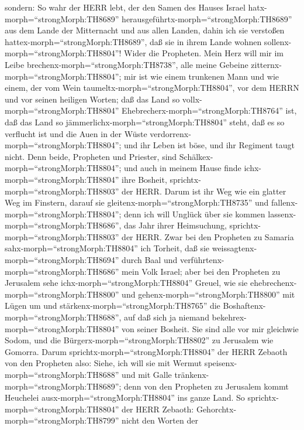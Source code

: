  sondern: So wahr der HERR lebt, der den Samen des Hauses
Israel hatx-morph=``strongMorph:TH8689''
herausgeführtx-morph=``strongMorph:TH8689'' aus dem Lande der
Mitternacht und aus allen Landen, dahin ich sie verstoßen
hattex-morph=``strongMorph:TH8689'', daß sie in ihrem Lande wohnen
sollenx-morph=``strongMorph:TH8804''!  Wider die Propheten.
Mein Herz will mir im Leibe brechenx-morph=``strongMorph:TH8738'', alle
meine Gebeine zitternx-morph=``strongMorph:TH8804''; mir ist wie einem
trunkenen Mann und wie einem, der vom Wein
taumeltx-morph=``strongMorph:TH8804'', vor dem HERRN und vor seinen
heiligen Worten;  daß das Land so
vollx-morph=``strongMorph:TH8804''
Ehebrecherx-morph=``strongMorph:TH8764'' ist, daß das Land so
jämmerlichx-morph=``strongMorph:TH8804'' steht, daß es so verflucht ist
und die Auen in der Wüste verdorrenx-morph=``strongMorph:TH8804''; und
ihr Leben ist böse, und ihr Regiment taugt nicht.  Denn
beide, Propheten und Priester, sind
Schälkex-morph=``strongMorph:TH8804''; und auch in meinem Hause finde
ichx-morph=``strongMorph:TH8804'' ihre Bosheit,
sprichtx-morph=``strongMorph:TH8803'' der HERR.  Darum ist
ihr Weg wie ein glatter Weg im Finstern, darauf sie
gleitenx-morph=``strongMorph:TH8735'' und
fallenx-morph=``strongMorph:TH8804''; denn ich will Unglück über sie
kommen lassenx-morph=``strongMorph:TH8686'', das Jahr ihrer Heimsuchung,
sprichtx-morph=``strongMorph:TH8803'' der HERR.  Zwar bei
den Propheten zu Samaria sahx-morph=``strongMorph:TH8804'' ich Torheit,
daß sie weissagtenx-morph=``strongMorph:TH8694'' durch Baal und
verführtenx-morph=``strongMorph:TH8686'' mein Volk Israel; 
aber bei den Propheten zu Jerusalem sehe
ichx-morph=``strongMorph:TH8804'' Greuel, wie sie
ehebrechenx-morph=``strongMorph:TH8800'' und
gehenx-morph=``strongMorph:TH8800'' mit Lügen um und
stärkenx-morph=``strongMorph:TH8765'' die
Boshaftenx-morph=``strongMorph:TH8688'', auf daß sich ja niemand
bekehrex-morph=``strongMorph:TH8804'' von seiner Bosheit. Sie sind alle
vor mir gleichwie Sodom, und die Bürgerx-morph=``strongMorph:TH8802'' zu
Jerusalem wie Gomorra.  Darum
sprichtx-morph=``strongMorph:TH8804'' der HERR Zebaoth von den Propheten
also: Siehe, ich will sie mit Wermut
speisenx-morph=``strongMorph:TH8688'' und mit Galle
tränkenx-morph=``strongMorph:TH8689''; denn von den Propheten zu
Jerusalem kommt Heuchelei ausx-morph=``strongMorph:TH8804'' ins ganze
Land.  So sprichtx-morph=``strongMorph:TH8804'' der HERR
Zebaoth: Gehorchtx-morph=``strongMorph:TH8799'' nicht den Worten der
